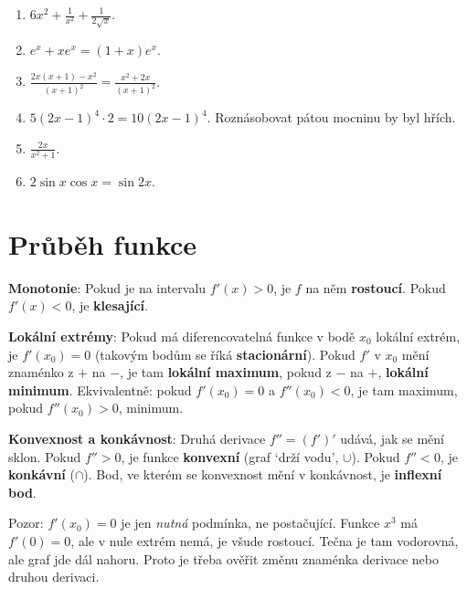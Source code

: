 \begin{solution}
  \begin{enumerate}[label=(\alph*)]
    \item $6x^2 + \frac{1}{x^2} + \frac{1}{2\sqrt{x}}$.
    \item $e^x + xe^x = (1 + x)e^x$.
    \item $\frac{2x(x + 1) - x^2}{{(x + 1)}^2} = \frac{x^2 + 2x}{{(x + 1)}^2}$.
    \item $5{(2x - 1)}^4\cdot 2 = 10{(2x - 1)}^4$. Roznásobovat pátou mocninu by byl hřích.
    \item $\frac{2x}{x^2 + 1}$.
    \item $2\sin x\cos x = \sin 2x$.
  \end{enumerate}
\end{solution}

\section{Průběh funkce}\label{sec:prubeh-funkce}

\begin{definitionbox}
  \textbf{Monotonie}: Pokud je na intervalu $f'(x) > 0$, je $f$ na něm \textbf{rostoucí}. Pokud $f'(x) < 0$, je \textbf{klesající}.

  \textbf{Lokální extrémy}: Pokud má diferencovatelná funkce v bodě $x_0$ lokální extrém, je $f'(x_0) = 0$ (takovým bodům se říká \textbf{stacionární}). Pokud $f'$ v $x_0$ mění znaménko z $+$ na $-$, je tam \textbf{lokální maximum}, pokud z $-$ na $+$, \textbf{lokální minimum}. Ekvivalentně: pokud $f'(x_0) = 0$ a $f''(x_0) < 0$, je tam maximum, pokud $f''(x_0) > 0$, minimum.

  \textbf{Konvexnost a konkávnost}: Druhá derivace $f'' = (f')'$ udává, jak se mění sklon. Pokud $f'' > 0$, je funkce \textbf{konvexní} (graf `drží vodu', $\cup$). Pokud $f'' < 0$, je \textbf{konkávní} ($\cap$). Bod, ve kterém se konvexnost mění v konkávnost, je \textbf{inflexní bod}.
\end{definitionbox}

Pozor: $f'(x_0) = 0$ je jen \textit{nutná} podmínka, ne postačující. Funkce $x^3$ má $f'(0) = 0$, ale v nule extrém nemá, je všude rostoucí. Tečna je tam vodorovná, ale graf jde dál nahoru. Proto je třeba ověřit změnu znaménka derivace nebo druhou derivaci.

